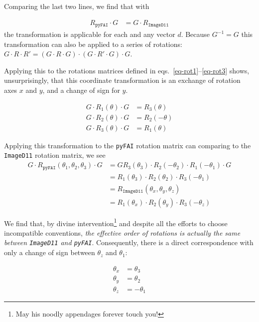 \documentclass[12pt]{article}
\begin{document}
Comparing the last two lines, we find that with

\begin{align}
  R_{\mathtt{pyFAI}} \cdot G
  & =
  G \cdot R_{\mathtt{ImageD11}} 
\end{align}
the transformation is applicable for each and any vector $d$.  Because
$G^{-1} = G$ this transformation can also be applied to a series of
rotations: $G \cdot R \cdot R' = (G \cdot R \cdot G) \cdot (G \cdot R'
\cdot G) \cdot G$.

Applying this to the rotations matrices defined in
eqs.~\ref{eq-rot1}--\ref{eq-rot3} shows, unsurprisingly, that this
coordinate transformation is an exchange of rotation axes $x$ and
$y$, and a change of sign for $y$.

\begin{align}
  G \cdot R_1(\theta) \cdot G & = R_3(\theta) \\
  G \cdot R_2(\theta) \cdot G & = R_2(-\theta) \\
  G \cdot R_3(\theta) \cdot G & = R_1(\theta)
\end{align}

Applying this transformation to the \texttt{pyFAI} rotation matrix can
comparing to the \texttt{ImageD11} rotation matrix, we see
\begin{align}
  G \cdot R_{\mathtt{pyFAI}}(\theta_1, \theta_2, \theta_3)
  \cdot G
  & =
  G R_3(\theta_3) \cdot R_2(-\theta_2) \cdot R_1(-\theta_1)
  \cdot G
  \\
  & =
  R_1(\theta_3) \cdot R_2(\theta_2) \cdot R_3(-\theta_1)
  \\
  & =
  R_{\mathtt{ImageD11}}(\theta_x, \theta_y, \theta_z)
  \\
  & = 
  R_1(\theta_x) \cdot R_2(\theta_y) \cdot R_3(-\theta_z)
\end{align}

We find that, by divine intervention\footnote{May his noodly
  appendages forever touch you!} and despite all the efforts to choose
incompatible conventions, \emph{the effective order of rotations is
  actually the same between \texttt{ImageD11} and
  \texttt{pyFAI}}. Consequently, there is a direct correspondence with
only a change of sign between $\theta_z$ and $\theta_1$:

\begin{align}
  \theta_x & = \theta_3
  \label{eq-thetax}
  \\
  \theta_y & = \theta_2
  \label{eq-thetay}
  \\
  \theta_z & = -\theta_1
  \label{eq-thetaz}
\end{align}
\end{document}
